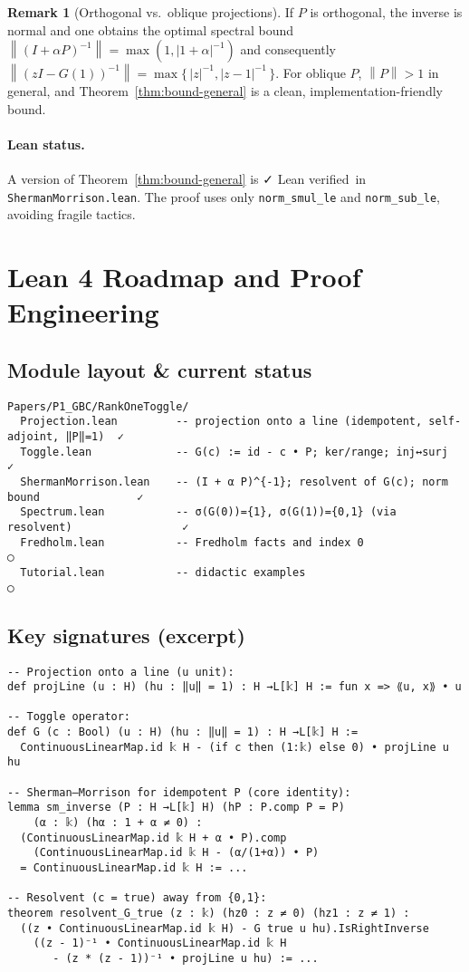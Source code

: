 \documentclass[11pt]{article}
\theoremstyle{definition}
\newtheorem{remark}[theorem]{Remark}
\newcommand{\norm}[1]{\left\lVert #1\right\rVert}
\newcommand{\leanok}{\textsf{\small \textcolor{green!60!black}{✓ Lean verified}}}
\begin{document}
\begin{remark}[Orthogonal vs.\ oblique projections]
If $P$ is orthogonal, the inverse is normal and one obtains the optimal spectral bound
\(
\norm{(I+\alpha P)^{-1}}=\max(1,|1+\alpha|^{-1})
\)
and consequently
\(
\norm{(zI-G(1))^{-1}}=\max\{\,|z|^{-1},|z-1|^{-1}\,\}.
\)
For oblique $P$, $\norm{P}>1$ in general, and Theorem~\ref{thm:bound-general} is a clean, implementation-friendly bound.
\end{remark}

\paragraph{Lean status.} A version of Theorem~\ref{thm:bound-general} is \leanok\ in \texttt{ShermanMorrison.lean}. The proof uses only \texttt{norm\_smul\_le} and \texttt{norm\_sub\_le}, avoiding fragile tactics.

\section{Lean 4 Roadmap and Proof Engineering}\label{sec:lean}

\subsection*{Module layout \& current status}
\begin{verbatim}
Papers/P1_GBC/RankOneToggle/
  Projection.lean         -- projection onto a line (idempotent, self-adjoint, ‖P‖=1)  ✓
  Toggle.lean             -- G(c) := id - c • P; ker/range; inj↔surj                    ✓
  ShermanMorrison.lean    -- (I + α P)^{-1}; resolvent of G(c); norm bound               ✓
  Spectrum.lean           -- σ(G(0))={1}, σ(G(1))={0,1} (via resolvent)                 ✓
  Fredholm.lean           -- Fredholm facts and index 0                                  ◯
  Tutorial.lean           -- didactic examples                                          ◯
\end{verbatim}

\subsection*{Key signatures (excerpt)}
\begin{lstlisting}
-- Projection onto a line (u unit):
def projLine (u : H) (hu : ‖u‖ = 1) : H →L[𝕜] H := fun x => ⟪u, x⟫ • u

-- Toggle operator:
def G (c : Bool) (u : H) (hu : ‖u‖ = 1) : H →L[𝕜] H :=
  ContinuousLinearMap.id 𝕜 H - (if c then (1:𝕜) else 0) • projLine u hu

-- Sherman–Morrison for idempotent P (core identity):
lemma sm_inverse (P : H →L[𝕜] H) (hP : P.comp P = P)
    (α : 𝕜) (hα : 1 + α ≠ 0) :
  (ContinuousLinearMap.id 𝕜 H + α • P).comp
    (ContinuousLinearMap.id 𝕜 H - (α/(1+α)) • P)
  = ContinuousLinearMap.id 𝕜 H := ...

-- Resolvent (c = true) away from {0,1}:
theorem resolvent_G_true (z : 𝕜) (hz0 : z ≠ 0) (hz1 : z ≠ 1) :
  ((z • ContinuousLinearMap.id 𝕜 H) - G true u hu).IsRightInverse
    ((z - 1)⁻¹ • ContinuousLinearMap.id 𝕜 H
       - (z * (z - 1))⁻¹ • projLine u hu) := ...
\end{lstlisting}
\end{document}

